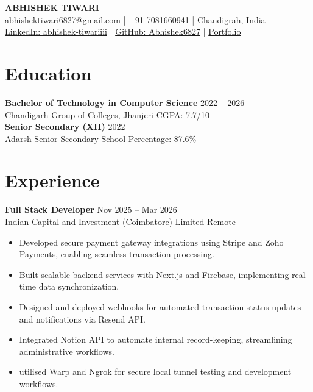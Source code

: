 \documentclass[a4paper,10pt]{article}
\begin{document}
\begin{center}
    {\Huge \textbf{ABHISHEK TIWARI}} \\ \vspace{2mm}
    \href{mailto:abhishektiwari6827@gmail.com}{abhishektiwari6827@gmail.com} | +91 7081660941 | Chandigrah, India \\
    \href{https://www.linkedin.com/in/abhishek-tiwariiii}{LinkedIn: abhishek-tiwariiii} | \href{https://github.com/Abhishek6827}{GitHub: Abhishek6827} | \href{https://abhishek6827.github.io/Portfolio/}{Portfolio}
\end{center}

\section{Education}
\textbf{Bachelor of Technology in Computer Science} \hfill 2022 -- 2026 \\
Chandigarh Group of Colleges, Jhanjeri \hfill CGPA: 7.7/10 \\
\vspace{2mm}
\textbf{Senior Secondary (XII)} \hfill 2022 \\
Adarsh Senior Secondary School \hfill Percentage: 87.6\%

\section{Experience}

\textbf{Full Stack Developer} \hfill Nov 2025 -- Mar 2026 \\
Indian Capital and Investment (Coimbatore) Limited \hfill Remote
\begin{itemize}[leftmargin=0.15in, label={-}]
    \item Developed secure payment gateway integrations using Stripe and Zoho Payments, enabling seamless transaction processing.
    \item Built scalable backend services with Next.js and Firebase, implementing real-time data synchronization.
    \item Designed and deployed webhooks for automated transaction status updates and notifications via Resend API.
    \item Integrated Notion API to automate internal record-keeping, streamlining administrative workflows.
    \item utilised Warp and Ngrok for secure local tunnel testing and development workflows.
\end{itemize}
\end{document}
